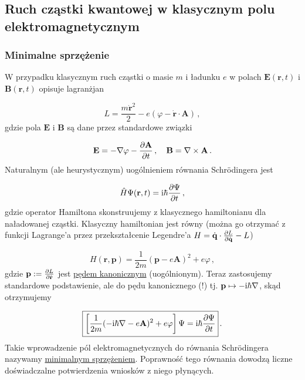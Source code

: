 \documentclass{myclass}
\begin{document}
\subsection{Ruch cząstki kwantowej w klasycznym polu elektromagnetycznym}

\subsubsection{Minimalne sprzężenie}

W przypadku klasycznym ruch cząstki o masie \(m\) i ładunku \(e\) w polach
\(\mathbf{E}(\mathbf{r},t)\) i \(\mathbf{B}(\mathbf{r},t)\) opisuje lagranżjan

\begin{equation*}
    L=\frac{m\dot{\mathbf{r}}^2}{2}-e\left(\varphi-\dot{\mathbf{r}}\cdot\mathbf{A}\right)\,,
\end{equation*}
gdzie pola \(\mathbf{E}\) i \(\mathbf{B}\) są dane przez standardowe związki

\begin{equation*}
    \mathbf{E}=-\nabla\varphi-\pdv{\mathbf{A}}{t}\,,\quad \mathbf{B}=\nabla\times\mathbf{A}\,.
\end{equation*}
Naturalnym (ale heurystycznym) uogólnieniem równania Schr{\"o}dingera jest

\begin{equation*}
    \hat{H}\Psi(\mathbf{r},t)=\mathrm{i}\hbar\pdv{\Psi}{t}\,,
\end{equation*}
gdzie operator Hamiltona skonstruujemy z klasycznego hamiltonianu dla naładowanej cząstki. Klasyczny
hamiltonian jest równy (można go otrzymać z funkcji Lagrange'a przez przekształcenie Legendre'a
\(H=\dot{\mathbf{q}}\cdot\pdv{L}{\dot{\mathbf{q}}}-L\))

\begin{equation*}
    H(\mathbf{r},\mathbf{p})=\frac{1}{2m}(\mathbf{p}-e\mathbf{A})^2+e\varphi\,,
\end{equation*}
gdzie \(\mathbf{p}:=\pdv{L}{\dot{\mathbf{r}}}\) jest \underline{pędem kanonicznym} (uogólnionym).
Teraz zastosujemy standardowe podstawienie, ale do pędu kanonicznego (!) tj. \(\mathbf{p}\mapsto
-\mathrm{i}\hbar\nabla\), skąd otrzymujemy

\begin{equation*}
    \boxed{\left[\frac{1}{2m}(-\mathrm{i}\hbar\nabla-e\mathbf{A})^2+e\varphi\right]\Psi=\mathrm{i}\hbar\pdv{\Psi}{t}}\,.
\end{equation*}
Takie wprowadzenie pól elektromagnetycznych do równania Schr{\"o}dingera nazywamy
\underline{minimalnym sprzężeniem}. Poprawność tego równania dowodzą liczne doświadczalne
potwierdzenia wniosków z niego płynących.
\medskip
\end{document}
